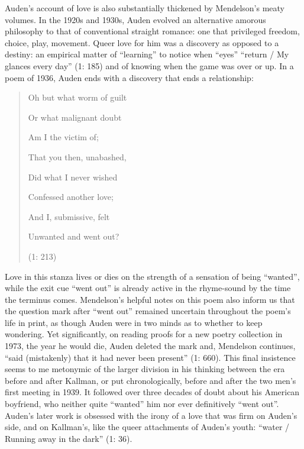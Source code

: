 \begin{review}
Auden's account of love is also substantially thickened by Mendelson's meaty volumes. In the 1920s and 1930s, Auden evolved an
alternative amorous philosophy to that of conventional straight romance:
one that privileged freedom, choice, play, movement. Queer love for him
was a discovery as opposed to a destiny: an empirical matter of
``learning'' to notice when ``eyes'' ``return / My glances every day''
(1: 185) and of knowing when the game was over or up. In a poem of 1936,
Auden ends with a discovery that ends a relationship:

\begin{quote}
Oh but what worm of guilt

Or what malignant doubt

Am I the victim of;

That you then, unabashed,

Did what I never wished

Confessed another love;

And I, submissive, felt

Unwanted and went out?

\begin{flushright}
    (1: 213)
\end{flushright}
\end{quote}

\noindent Love in this stanza lives or dies on the strength of a sensation of
being ``wanted'', while the exit cue ``went out'' is already active in
the rhyme-sound by the time the terminus comes. Mendelson's helpful
notes on this poem also inform us that the question mark after ``went
out'' remained uncertain throughout the poem's life in print, as though
Auden were in two minds as to whether to keep wondering. Yet
significantly, on reading proofs for a new poetry collection in 1973,
the year he would die, Auden deleted the mark and, Mendelson continues,
``said (mistakenly) that it had never been present'' (1: 660). This
final insistence seems to me metonymic of the larger division in his
thinking between the era before and after Kallman, or put
chronologically, before and after the two men's first meeting in 1939.
It followed over three decades of doubt about his American boyfriend,
who neither quite ``wanted'' him nor ever definitively ``went out''.
Auden's later work is obsessed with the irony of a love that was firm on
Auden's side, and on Kallman's, like the queer attachments of Auden's
youth: ``water / Running away in the dark'' (1: 36).


\end{review}
